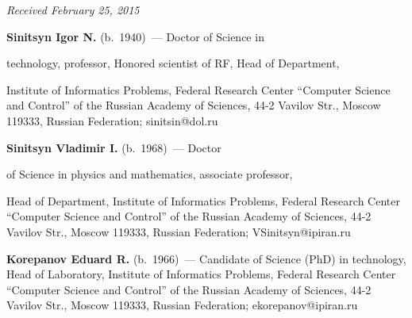 \vspace*{-3pt}



\hfill{\small\textit{Received February 25, 2015}}



\vspace*{-9pt}



\Contr



\noindent

\textbf{Sinitsyn Igor N.} (b.\ 1940)~--- Doctor of Science in 

technology, professor, Honored scientist of RF, Head of Department, 

Institute of Informatics Problems, Federal Research Center ``Computer Science and Control'' of the Russian Academy of Sciences, 44-2 Vavilov Str., Moscow 119333, Russian Federation; sinitsin@dol.ru



\vspace*{3pt}





     \noindent

\textbf{Sinitsyn Vladimir I.} (b.\ 1968)~--- Doctor 

of Science in physics and mathematics, associate professor, 

Head of Department, Institute of Informatics Problems, Federal Research Center ``Computer Science and Control'' of the Russian Academy of Sciences, 44-2 Vavilov Str., Moscow 119333, Russian Federation; VSinitsyn@ipiran.ru



\vspace*{3pt}



    \noindent

\textbf{Korepanov Eduard R.} (b.\ 1966)~--- Candidate of Science (PhD) in technology, Head of Laboratory, Institute of Informatics Problems, Federal Research Center ``Computer Science and Control'' of the Russian Academy of Sciences, 44-2 Vavilov Str., Moscow 119333, Russian Federation; ekorepanov@ipiran.ru





\label{end\stat}





\renewcommand{\bibname}{\protect\rm Литература} 
